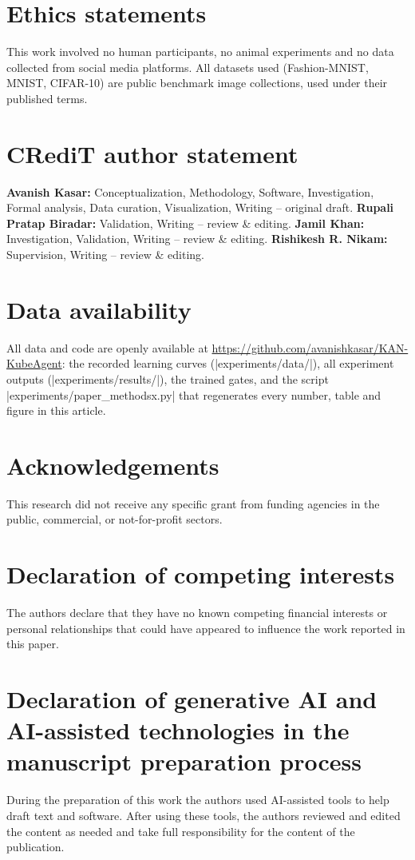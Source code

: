\section*{Ethics statements}
This work involved no human participants, no animal experiments and no data collected from social media platforms. All datasets used (Fashion-MNIST, MNIST, CIFAR-10) are public benchmark image collections, used under their published terms.

\section*{CRediT author statement}
\textbf{Avanish Kasar:} Conceptualization, Methodology, Software, Investigation, Formal analysis, Data curation, Visualization, Writing -- original draft.
\textbf{Rupali Pratap Biradar:} Validation, Writing -- review \& editing.
\textbf{Jamil Khan:} Investigation, Validation, Writing -- review \& editing.
\textbf{Rishikesh R. Nikam:} Supervision, Writing -- review \& editing.

\section*{Data availability}
All data and code are openly available at \url{https://github.com/avanishkasar/KAN-KubeAgent}: the \nRuns{} recorded learning curves (\cmd|experiments/data/|), all experiment outputs (\cmd|experiments/results/|), the trained gates, and the script \cmd|experiments/paper_methodsx.py| that regenerates every number, table and figure in this article.

\section*{Acknowledgements}
This research did not receive any specific grant from funding agencies in the public, commercial, or not-for-profit sectors.

\section*{Declaration of competing interests}
The authors declare that they have no known competing financial interests or personal relationships that could have appeared to influence the work reported in this paper.

\section*{Declaration of generative AI and AI-assisted technologies in the manuscript preparation process}
During the preparation of this work the authors used AI-assisted tools to help draft text and software. After using these tools, the authors reviewed and edited the content as needed and take full responsibility for the content of the publication.
